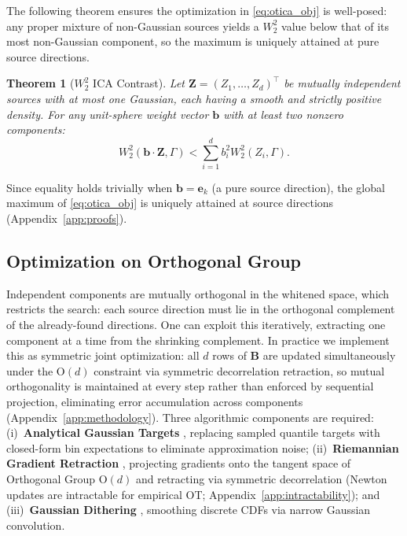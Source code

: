 \documentclass{tpm2026} %
\newtheorem{theorem}{Theorem}
\begin{document}
The following theorem ensures the optimization in \eqref{eq:otica_obj} is well-posed: any proper mixture of non-Gaussian sources yields a $W_2^2$ value below that of its most non-Gaussian component, so the maximum is uniquely attained at pure source directions.

\begin{theorem}[$W_2^2$ ICA Contrast]\label{th:main}
Let $\mathbf{Z} = (Z_1, \dots, Z_d)^\top$ be mutually independent sources with at most one Gaussian, each having a smooth and strictly positive density. For any unit-sphere weight vector $\mathbf{b}$ with at least two nonzero components:
\begin{equation}
    W_2^2(\mathbf{b} \cdot \mathbf{Z}, \Gamma) < \sum_{i=1}^d b_i^2 W_2^2(Z_i, \Gamma).
\end{equation}
\end{theorem}

Since equality holds trivially when $\mathbf{b} = \mathbf{e}_k$ (a pure source direction), the global maximum of \eqref{eq:otica_obj} is uniquely attained at source directions (Appendix~\ref{app:proofs}).

\subsection{Optimization on Orthogonal Group}
Independent components are mutually orthogonal in the whitened space, which restricts the search: each source direction must lie in the orthogonal complement of the already-found directions.
One can exploit this iteratively, extracting one component at a time from the shrinking complement.
In practice we implement this as symmetric joint optimization: all $d$ rows of $\mathbf{B}$ are updated simultaneously under the $\mathrm{O}(d)$ constraint via symmetric decorrelation retraction, so mutual orthogonality is maintained at every step rather than enforced by sequential projection, eliminating error accumulation across components (Appendix~\ref{app:methodology}).
Three algorithmic components are required: (i)~\textbf{Analytical Gaussian Targets} \citep{fournier2015rate}, replacing sampled quantile targets with closed-form bin expectations to eliminate approximation noise; (ii)~\textbf{Riemannian Gradient Retraction} \citep{absil2008optimization}, projecting gradients onto the tangent space of Orthogonal Group $\mathrm{O}(d)$ and retracting via symmetric decorrelation (Newton updates are intractable for empirical OT; Appendix~\ref{app:intractability}); and (iii)~\textbf{Gaussian Dithering} \citep{schuchman1964dither}, smoothing discrete CDFs via narrow Gaussian convolution.
\end{document}
